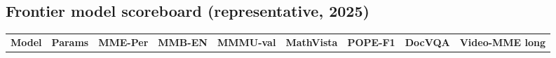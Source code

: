 \subsection{Frontier model scoreboard (representative, 2025)}\label{frontier-model-scoreboard-representative-2025}

{\def\LTcaptype{none} %
\begin{longtable}[]{@{}
  >{\raggedright\arraybackslash}p{}
  >{\raggedright\arraybackslash}p{}
  >{\raggedright\arraybackslash}p{}
  >{\raggedright\arraybackslash}p{}
  >{\raggedright\arraybackslash}p{}
  >{\raggedright\arraybackslash}p{}
  >{\raggedright\arraybackslash}p{}
  >{\raggedright\arraybackslash}p{}
  >{\raggedright\arraybackslash}p{}@{}}
\toprule\noalign{}
\begin{minipage}[b]{\linewidth}\raggedright
\textbf{Model}
\end{minipage} & \begin{minipage}[b]{\linewidth}\raggedright
\textbf{Params}
\end{minipage} & \begin{minipage}[b]{\linewidth}\raggedright
\textbf{MME-Per}
\end{minipage} & \begin{minipage}[b]{\linewidth}\raggedright
\textbf{MMB-EN}
\end{minipage} & \begin{minipage}[b]{\linewidth}\raggedright
\textbf{MMMU-val}
\end{minipage} & \begin{minipage}[b]{\linewidth}\raggedright
\textbf{MathVista}
\end{minipage} & \begin{minipage}[b]{\linewidth}\raggedright
\textbf{POPE-F1}
\end{minipage} & \begin{minipage}[b]{\linewidth}\raggedright
\textbf{DocVQA}
\end{minipage} & \begin{minipage}[b]{\linewidth}\raggedright
\textbf{Video-MME long}
\end{minipage} \\

\end{longtable}}
